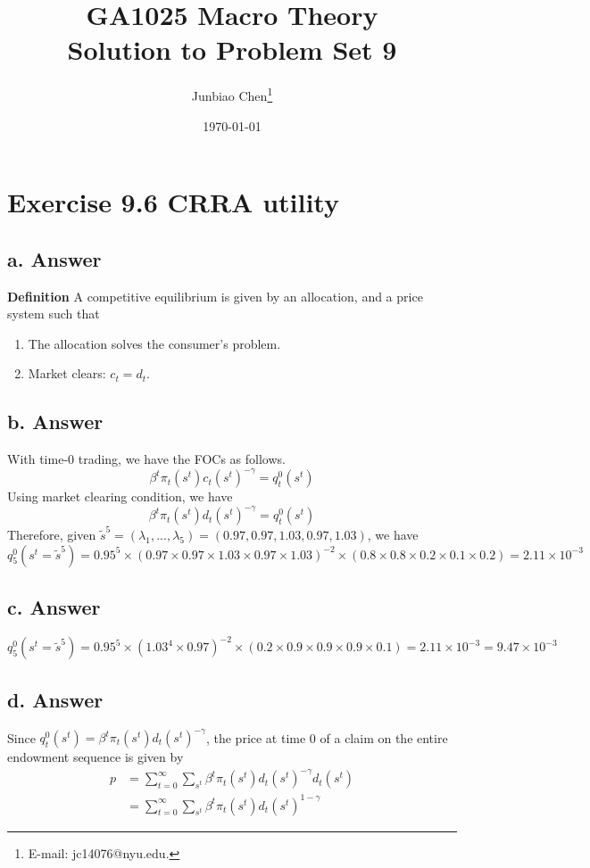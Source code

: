\documentclass[11pt]{article}
\title{GA1025 Macro Theory \\Solution to Problem Set 9}
\author{
Junbiao Chen\thanks{E-mail: jc14076@nyu.edu.}
}
\date{\today}
\theoremstyle{definition}
\theoremstyle{boldtitle} %
\numberwithin{equation}{section}
\numberwithin{figure}{section}
\numberwithin{table}{section}
\begin{document}
\maketitle

\section{Exercise 9.6 CRRA utility}
\subsection{a. Answer}
\noindent \textbf{Definition} A competitive equilibrium is given by 
an allocation, and a price system such that 
\begin{enumerate}
    \item The allocation solves the consumer's problem.
    \item Market clears: $c_t = d_t$.
\end{enumerate}

\subsection{b. Answer}
With time-0 trading, we have the FOCs as follows.
\[
\beta^t \pi_t(s^t) c_t(s^t)^{-\gamma} = q_t^0(s^t)
\]
Using market clearing condition, we have 
\[
\beta^t \pi_t(s^t) d_t(s^t)^{-\gamma} = q_t^0(s^t)
\]
Therefore, given 
$\tilde{s}^5 = (\lambda_1, ..., \lambda_5) = 
(0.97, 0.97, 1.03, 0.97, 1.03)$, 
we have 
\[
q_5^0(s^t = \tilde{s}^5) = 0.95^5 \times 
(0.97 \times  0.97 \times  1.03 \times  0.97 \times 1.03)^{-2} \times 
(0.8 \times 0.8 \times 0.2 \times 0.1 \times 0.2) = 2.11 \times 10^{-3}
\]

\subsection{c. Answer}
\[
q_5^0(s^t = \tilde{s}^5) = 0.95^5 \times 
(1.03^4 \times 0.97)^{-2} \times 
(0.2 \times 0.9 \times 0.9 \times 0.9 \times 0.1) = 2.11 \times 10^{-3} = 9.47\times 10^{-3}
\]

\subsection{d. Answer}
Since $q^0_t(s^t) = \beta^t \pi_t(s^t) d_t(s^t)^{-\gamma}$, the price at time 0 
of a claim on the entire endowment sequence is given by 
\begin{align*}
p & = \sum_{t=0}^\infty \sum_{s^t} \beta^t \pi_t(s^t) d_t(s^t)^{-\gamma} d_t(s^t) \\ 
    & = \sum_{t=0}^\infty \sum_{s^t} \beta^t \pi_t(s^t) d_t(s^t)^{1-\gamma} 
\end{align*}
\end{document}
